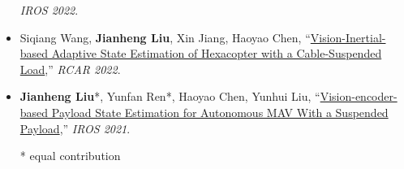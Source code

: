 \begin{itemize}
	\emph{IROS 2022}.\\
	\vspace{-8pt}
	\item Siqiang Wang, \textbf{Jianheng Liu}, Xin Jiang, Haoyao Chen, ``\href{https://ieeexplore.ieee.org/abstract/document/9872194}{Vision-Inertial-based Adaptive State Estimation of Hexacopter with a Cable-Suspended Load},''
	\emph{RCAR 2022}.\\
	\vspace{-8pt}
	\item \textbf{Jianheng Liu}*, Yunfan Ren*, Haoyao Chen, Yunhui Liu, ``\href{https://github.com/jianhengLiu/Vision-encoder-based-Payload-State-Estimator}{Vision-encoder-based Payload State Estimation for Autonomous MAV With a Suspended Payload},''
	\emph{IROS 2021}.\\
	\vspace{-8pt}

\footnotesize{* equal contribution}
\end{itemize}